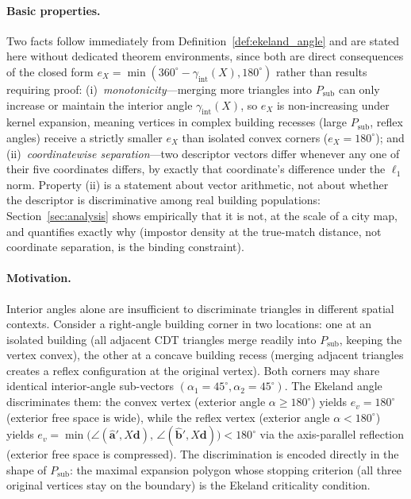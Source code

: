 \documentclass[10pt]{article}
\theoremstyle{plain}
\theoremstyle{definition}
\begin{document}
\paragraph{Basic properties.}
Two facts follow immediately from Definition~\ref{def:ekeland_angle} and are
stated here without dedicated theorem environments, since both are direct
consequences of the closed form
$e_X = \min(360^\circ - \gamma_{\mathrm{int}}(X), 180^\circ)$ rather than
results requiring proof: (i)~\emph{monotonicity}---merging more triangles
into $P_{\mathrm{sub}}$ can only increase or maintain the interior angle
$\gamma_{\mathrm{int}}(X)$, so $e_X$ is non-increasing under kernel
expansion, meaning vertices in complex building recesses (large
$P_{\mathrm{sub}}$, reflex angles) receive a strictly smaller $e_X$ than
isolated convex corners ($e_X = 180^\circ$); and (ii)~\emph{coordinatewise
separation}---two descriptor vectors differ whenever any one of their five
coordinates differs, by exactly that coordinate's difference under the
$\ell_1$ norm. Property (ii) is a statement about vector arithmetic, not
about whether the descriptor is discriminative among real building
populations: Section~\ref{sec:analysis} shows empirically that it is not, at
the scale of a city map, and quantifies exactly why (impostor density at the
true-match distance, not coordinate separation, is the binding constraint).


\paragraph{Motivation.}
Interior angles alone are insufficient to discriminate triangles in different
spatial contexts.
Consider a right-angle building corner in two locations: one at an isolated
building (all adjacent CDT triangles merge readily into $P_{\mathrm{sub}}$,
keeping the vertex convex), the other at a concave building recess (merging
adjacent triangles creates a reflex configuration at the original vertex).
Both corners may share identical interior-angle sub-vectors
$(\alpha_1 = 45^\circ, \alpha_2 = 45^\circ)$.
The Ekeland angle discriminates them: the convex vertex (exterior angle
$\alpha \ge 180^\circ$) yields $e_v = 180^\circ$ (exterior free space is wide),
while the reflex vertex (exterior angle $\alpha < 180^\circ$) yields
$e_v = \min\!\bigl(\angle(\hat{\mathbf{a}}', X\mathbf{d}),\,
\angle(\hat{\mathbf{b}}', X\mathbf{d})\bigr) < 180^\circ$ via the
axis-parallel reflection (exterior free space is compressed).
The discrimination is encoded directly in the shape of $P_{\mathrm{sub}}$:
the maximal expansion polygon whose stopping criterion (all three original
vertices stay on the boundary) is the Ekeland criticality condition.
\end{document}

